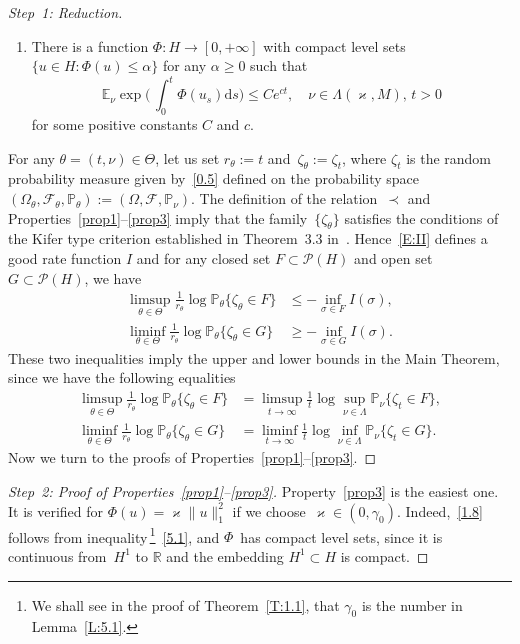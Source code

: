 \documentclass[AHL,Unicode,longabstracts]{cedram}
\newcommand{\R}{{\mathbb R}}
\newcommand{\IP}{{\mathbb P}}
\newcommand{\pP}{{\mathbb P}}
\newcommand{\E}{{\mathbb E}}
\newcommand{\FF}{{\mathcal F}}
\newcommand{\PP}{{\mathcal P}}
\newcommand{\vk}{{\varkappa}}
\newcommand{\ty}{\infty}
\newcommand{\dd}{\mathrm{d}}
\newenvironment{step}{\begin{proof}}{\let\qed\relax \end{proof}}
\begin{document}
\begin{proofc}
\begin{step}[Step~1: Reduction]
\begin{enumerate}
\item \label{prop3} There is a function $\varPhi : H \to [0,+\ty]$ with compact level sets $ \{u \in H : \varPhi(u)\le \alpha\}$ for any $\alpha\ge0$ such that
\begin{equation}\label{1.8}
\E_\nu\exp \biggl(\,\int_0^t\varPhi(u_s)\dd s\biggr)\le Ce^{c t},\quad \nu\in\Lambda(\vk,M),\, t>0
\end{equation}
for some positive constants $C$ and $c$.
\end{enumerate}
For any $\theta=(t,\nu)\in \Theta$, let us set $r_\theta:=t$ and~$\zeta_\theta:=\zeta_t$, where $\zeta_t$ is the random probability measure given by~\eqref{0.5} defined on the probability space~$(\Omega_\theta,\FF_\theta,\IP_\theta):=(\Omega,\FF,\IP_\nu)$. The definition of the relation~$\prec$ and Properties~\eqref{prop1}--\eqref{prop3} imply that the family~$\{\zeta_\theta\}$ satisfies the conditions of the Kifer type criterion established in Theorem~3.3 in~\cite{JNPS-2014}. Hence~\eqref{E:II} defines a good rate function $I$ and for any closed set $F\subset \PP(H)$ and open set $G\subset \PP(H)$, we have
\begin{align*}
\limsup_{\theta\in\Theta} \frac{1}{r_\theta}\log\pP_\theta\{\zeta_\theta\in F\}&\le -\inf_{\sigma\in F} I (\sigma),\\
\liminf_{\theta\in\Theta} \frac1{r_\theta}\log\pP_\theta\{\zeta_\theta\in G\}&\ge -\inf_{\sigma\in G} I (\sigma).
\end{align*}
These two inequalities imply the upper and lower bounds in the Main Theorem, since we have the following equalities
\begin{align*}
\limsup_{\theta\in\Theta} \frac{1}{r_\theta}\log\pP_\theta\{\zeta_\theta\in F\}&=\limsup_{t\to\infty} \frac1t\log \sup_{\nu\in\Lambda} \pP_\nu\{\zeta_t\in F\},\\
\liminf_{\theta\in\Theta} \frac1{r_\theta}\log\pP_\theta\{\zeta_\theta\in G\}&=\liminf_{t\to\infty} \frac1t\log \inf_{\nu\in\Lambda}\pP_\nu\{\zeta_t\in G\}.
\end{align*}
Now we turn to the proofs of Properties~\eqref{prop1}--\eqref{prop3}.
\end{step}

\begin{proof}[Step~2: Proof of Properties~\eqref{prop1}--\eqref{prop3}]
Property~\eqref{prop3} is the easiest one. It is verified for $\varPhi(u)=\varkappa \|u\|_1^2$ if we choose~$\varkappa\in (0,\gamma_0)$. Indeed,~\eqref{1.8} follows from inequality\,\footnote{We shall see in the proof of Theorem~\ref{T:1.1}, that $\gamma_0$ is the number in Lemma~\ref{L:5.1}.}~\eqref{5.1}, and $\varPhi$~has compact level sets, since it is continuous from~$H^1$ to $\R$ and the embedding $H^1\subset H$ is compact.


\end{proof}
\end{proofc}
\end{document}
